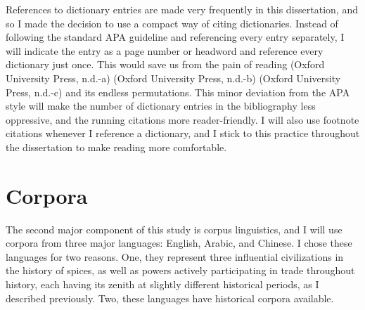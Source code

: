 

\begin{note}
    References to dictionary entries are made very frequently in this dissertation, and so I made the decision to use a compact way of citing dictionaries. Instead of following the standard APA  guideline and referencing every entry separately, I will indicate the entry as a page number or headword and reference every dictionary just once. This would save us from the pain of reading (Oxford University Press, n.d.-a) (Oxford University Press, n.d.-b) (Oxford University Press, n.d.-c) and its endless permutations. This minor deviation from the APA style will make the number of dictionary entries in the bibliography less oppressive, and the running citations more reader-friendly. I will also use footnote citations whenever I reference a dictionary, and I stick to this practice throughout the dissertation to make reading more comfortable.
\end{note}

\section{Corpora}

The second major component of this study is corpus linguistics, and I will use corpora from three major languages: English, Arabic, and Chinese. I chose these languages for two reasons. One, they represent three influential civilizations in the history of spices, as well as powers actively participating in trade throughout history, each having its zenith at slightly different historical periods, as I described previously. 
Two, these languages have historical corpora available.



